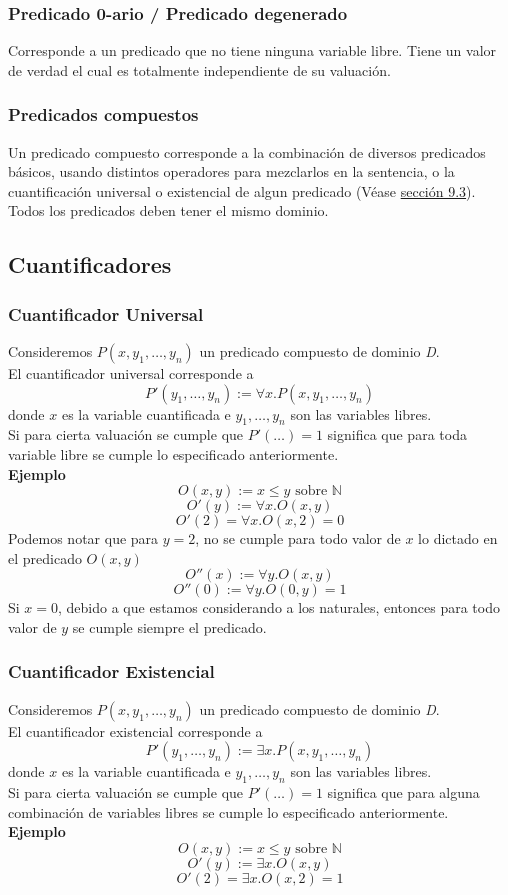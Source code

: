 \documentclass[../main.tex]{subfiles}
\begin{document}
\subsubsection{Predicado 0-ario / Predicado degenerado}
Corresponde a un predicado que no tiene ninguna variable libre. Tiene un valor de verdad el cual es totalmente independiente de su valuación.

\subsubsection{Predicados compuestos}
Un predicado compuesto corresponde a la combinación de diversos predicados básicos, usando distintos operadores para mezclarlos en la sentencia, o la cuantificación universal o existencial de algun predicado (Véase \hyperref[sec:cuantificadores]{sección 9.3}). Todos los predicados deben tener el mismo dominio.

\subsection{Cuantificadores}
\label{sec:cuantificadores}
\subsubsection{Cuantificador Universal}
Consideremos $P(x, y_{1}, \ldots{}, y_{n})$ un predicado compuesto de dominio \textit{D}.\\
El cuantificador universal corresponde a
$$P'(y_{1}, \ldots{}, y_{n}) := \forall{} x . P(x, y_{1}, \ldots{}, y_{n})$$
donde $x$ es la variable cuantificada e $y_{1}, \ldots{}, y_{n}$ son las variables libres.\\
Si para cierta valuación se cumple que $P'(\ldots{}) = 1$ significa que para toda variable libre se cumple lo especificado anteriormente.\\
\textbf{Ejemplo}
$$O(x,y) := x \leq y \text{ sobre } \mathds{N}$$
$$O'(y) := \forall x . O(x,y)$$
$$O'(2) = \forall x. O(x,2) = 0$$
Podemos notar que para $y = 2$, no se cumple para todo valor de $x$ lo dictado en el predicado $O(x,y)$
$$O''(x) := \forall y . O(x,y)$$
$$O''(0) := \forall y . O(0,y) = 1$$
Si $x = 0$, debido a que estamos considerando a los naturales, entonces para todo valor de $y$ se cumple siempre el predicado.

\subsubsection{Cuantificador Existencial}
Consideremos $P(x, y_{1}, \ldots{}, y_{n})$ un predicado compuesto de dominio \textit{D}.\\
El cuantificador existencial corresponde a
$$P'(y_{1}, \ldots{}, y_{n}) := \exists x . P(x, y_{1}, \ldots{}, y_{n})$$
donde $x$ es la variable cuantificada e $y_{1}, \ldots{}, y_{n}$ son las variables libres.\\
Si para cierta valuación se cumple que $P'(\ldots{}) = 1$ significa que para alguna combinación de variables libres se cumple lo especificado anteriormente.\\
\textbf{Ejemplo}
$$O(x,y) := x \leq y \text{ sobre } \mathds{N}$$
$$O'(y) := \exists x . O(x,y)$$
$$O'(2) = \exists x. O(x,2) = 1$$
\end{document}
